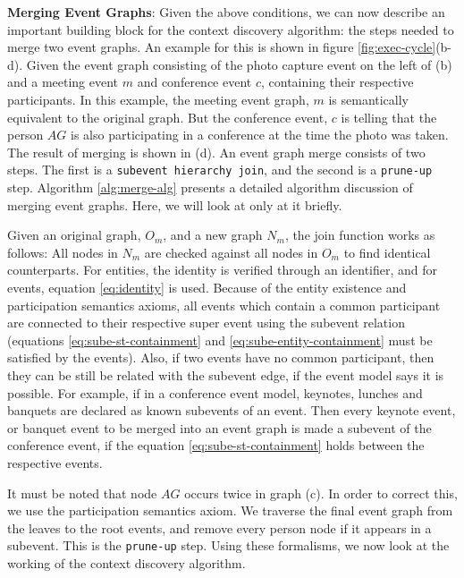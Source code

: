 \textbf{Merging Event Graphs}: Given the above conditions, we can now describe an important building block for the context discovery algorithm: the steps needed to merge two event graphs. An example for this is shown in figure \ref{fig:exec-cycle}(b-d). Given the event graph consisting of the photo capture event on the left of (b) and a meeting event $m$ and conference event $c$, containing their respective participants. In this example, the meeting event graph, $m$ is semantically equivalent to the original graph. But the conference event, $c$ is telling that the person $AG$ is also participating in a conference at the time the photo was taken. The result of merging is shown in (d). An event graph merge consists of two steps. The first is a \texttt{subevent hierarchy join}, and the second is a \texttt{prune-up} step. Algorithm \ref{alg:merge-alg} presents a detailed algorithm discussion of merging event graphs. Here, we will look at only at it briefly.

Given an original graph, $O_m$, and a new graph $N_m$, the join function works as follows: All nodes in $N_m$ are checked against all nodes in $O_m$ to find identical counterparts. For entities, the identity is verified through an identifier, and for events, equation \eqref{eq:identity} is used. Because of the entity existence and participation semantics axioms, all events which contain a common participant are connected to their respective super event using the subevent relation (equations \eqref{eq:sube-st-containment} and \eqref{eq:sube-entity-containment} must be satisfied by the events). Also, if two events have no common participant, then they can be still be related with the subevent edge, if the event model says it is possible. For example, if in a conference event model, keynotes, lunches and banquets are declared as known subevents of an event. Then every keynote event, or banquet event to be merged into an event graph is made a subevent of the conference event, if the equation \eqref{eq:sube-st-containment} holds between the respective events. 

It must be noted that node $AG$ occurs twice in graph (c). In order to correct this, we use the participation semantics axiom. We traverse the final event graph from the leaves to the root events, and remove every person node if it appears in a subevent. This is the \texttt{prune-up} step. Using these formalisms, we now look at the working of the context discovery algorithm. 

